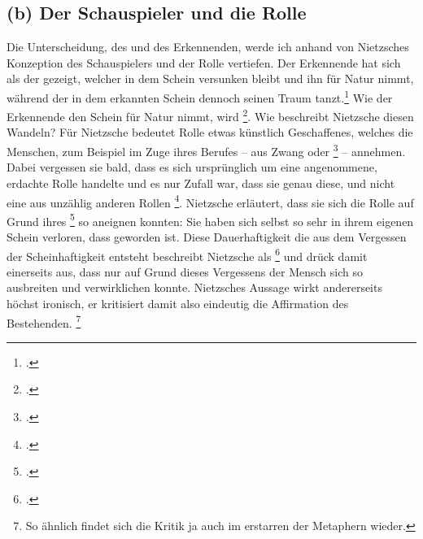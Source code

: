 \documentclass[12pt, a4paper, openany]{report}
\begin{document}
\subsection{(b) Der Schauspieler und die Rolle}
Die Unterscheidung, des  und des Erkennenden, werde ich anhand von Nietzsches Konzeption des Schauspielers und der Rolle vertiefen. 
Der Erkennende hat sich als der gezeigt, welcher in dem Schein versunken bleibt und ihn für Natur nimmt, während der  in dem erkannten Schein dennoch seinen Traum tanzt.\footcite[Vgl.][417]{nietzsche_morgenrote_1999}
Wie der Erkennende den Schein für Natur nimmt, wird \footcite[][595]{nietzsche_morgenrote_1999}.
Wie beschreibt Nietzsche diesen Wandeln?
Für Nietzsche bedeutet Rolle etwas künstlich Geschaffenes, welches die Menschen, zum Beispiel im Zuge ihres Berufes -- aus Zwang oder \footcite[][595]{nietzsche_morgenrote_1999} -- annehmen. 
Dabei vergessen sie bald, dass es sich ursprünglich um eine angenommene, erdachte Rolle handelte und es nur Zufall war, dass sie genau diese, und nicht eine aus unzählig anderen Rollen \footcite[][595]{nietzsche_morgenrote_1999}.
Nietzsche erläutert, dass sie sich die Rolle auf Grund ihres \footcite[][595]{nietzsche_morgenrote_1999} so aneignen konnten:
Sie haben sich selbst so sehr in ihrem eigenen Schein verloren, dass  geworden ist. 
Diese Dauerhaftigkeit die aus dem Vergessen der Scheinhaftigkeit entsteht beschreibt Nietzsche als \footcite[][595]{nietzsche_morgenrote_1999} und drück damit einerseits aus, dass nur auf Grund dieses Vergessens der Mensch sich so ausbreiten und verwirklichen konnte.
Nietzsches Aussage wirkt andererseits höchst ironisch, er kritisiert damit also eindeutig die Affirmation des Bestehenden.%
\footnote{
    So ähnlich findet sich die Kritik ja auch im erstarren der Metaphern wieder.
}\\ 
\end{document}
